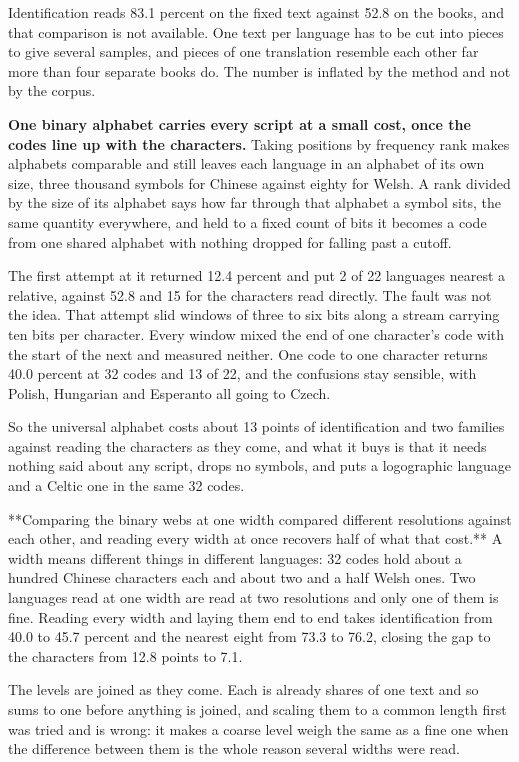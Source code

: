 Identification reads 83.1 percent on the fixed text against 52.8 on the books, and that comparison is not available. One text per language has to be cut into pieces to give several samples, and pieces of one translation resemble each other far more than four separate books do. The number is inflated by the method and not by the corpus.

\textbf{One binary alphabet carries every script at a small cost, once the codes line up with the characters.} Taking positions by frequency rank makes alphabets comparable and still leaves each language in an alphabet of its own size, three thousand symbols for Chinese against eighty for Welsh. A rank divided by the size of its alphabet says how far through that alphabet a symbol sits, the same quantity everywhere, and held to a fixed count of bits it becomes a code from one shared alphabet with nothing dropped for falling past a cutoff.

The first attempt at it returned 12.4 percent and put 2 of 22 languages nearest a relative, against 52.8 and 15 for the characters read directly. The fault was not the idea. That attempt slid windows of three to six bits along a stream carrying ten bits per character. Every window mixed the end of one character's code with the start of the next and measured neither. One code to one character returns 40.0 percent at 32 codes and 13 of 22, and the confusions stay sensible, with Polish, Hungarian and Esperanto all going to Czech.

So the universal alphabet costs about 13 points of identification and two families against reading the characters as they come, and what it buys is that it needs nothing said about any script, drops no symbols, and puts a logographic language and a Celtic one in the same 32 codes.

**Comparing the binary webs at one width compared different resolutions against each other, and reading every width at once recovers half of what that cost.** A width means different things in different languages: 32 codes hold about a hundred Chinese characters each and about two and a half Welsh ones. Two languages read at one width are read at two resolutions and only one of them is fine. Reading every width and laying them end to end takes identification from 40.0 to 45.7 percent and the nearest eight from 73.3 to 76.2, closing the gap to the characters from 12.8 points to 7.1.

The levels are joined as they come. Each is already shares of one text and so sums to one before anything is joined, and scaling them to a common length first was tried and is wrong: it makes a coarse level weigh the same as a fine one when the difference between them is the whole reason several widths were read.

